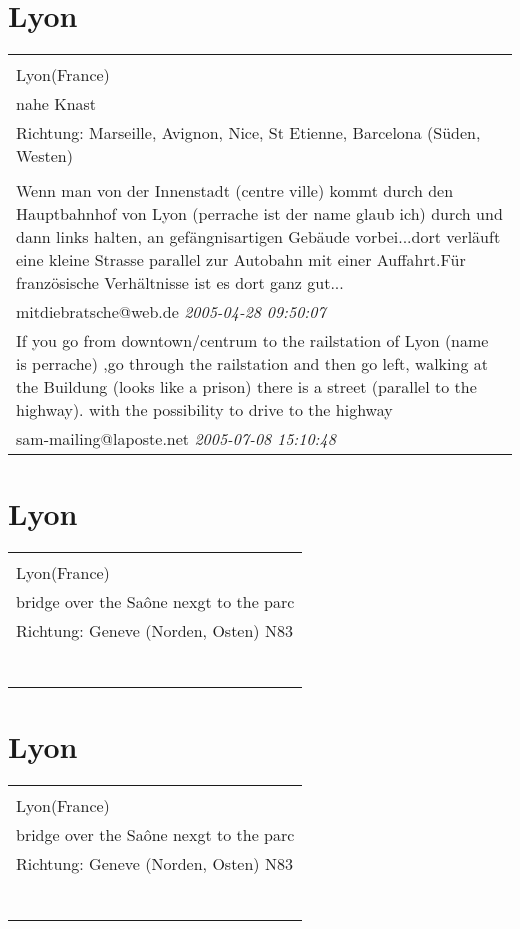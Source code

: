 \documentclass[a4paper,12pt]{article}
\begin{document}
\section{Lyon}
\begin{tabular}{|p{13cm}|}
\hline\\
Lyon(France)\\
nahe Knast\\
Richtung: Marseille, Avignon, Nice, St Etienne, Barcelona (Süden, Westen) \\
\hline\\
Wenn man von der Innenstadt (centre ville) kommt durch den Hauptbahnhof von Lyon (perrache ist der name glaub ich) durch und dann links halten, an gefängnisartigen Gebäude vorbei...dort verläuft eine kleine Strasse parallel zur Autobahn mit einer Auffahrt.Für französische Verhältnisse ist es dort ganz gut... \\
mitdiebratsche@web.de \textit{ 2005-04-28 09:50:07 }\\\hline If you go from downtown/centrum to the railstation of Lyon (name is perrache) ,go through the railstation and then go left, walking at the Buildung (looks like a prison)
there is a street (parallel to the highway). with the possibility to drive to the highway \\
sam-mailing@laposte.net \textit{ 2005-07-08 15:10:48 }\\\hline
\end{tabular}


\section{Lyon}
\begin{tabular}{|p{13cm}|}
\hline\\
Lyon(France)\\
bridge over the Saône nexgt to the parc\\
Richtung: Geneve (Norden, Osten) N83 \\
\hline\\
\\\
\end{tabular}


\section{Lyon}
\begin{tabular}{|p{13cm}|}
\hline\\
Lyon(France)\\
bridge over the Saône nexgt to the parc\\
Richtung: Geneve (Norden, Osten) N83 \\
\hline\\
\\\
\end{tabular}
\end{document}

